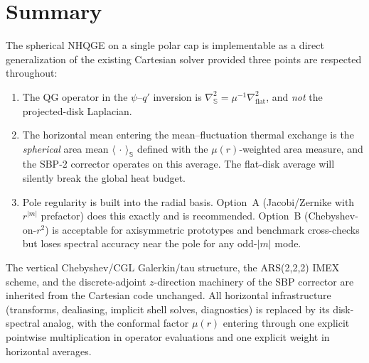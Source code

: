 \documentclass[11pt]{article}
\newcommand{\Lapproj}{\nabla^2_{\!\mathrm{flat}}}
\newcommand{\Lapsphere}{\nabla^2_{\!\mathbb{S}}}
\newcommand{\meanS}[1]{\langle #1 \rangle_{\mathbb{S}}}
\begin{document}
\section{Summary}

The spherical NHQGE on a single polar cap is implementable as a
direct generalization of the existing Cartesian solver provided
three points are respected throughout:

\begin{enumerate}[leftmargin=2em,itemsep=3pt]
  \item The QG operator in the $\psi$--$q'$ inversion is
  $\Lapsphere = \mu^{-1}\Lapproj$, and \emph{not} the projected-disk
  Laplacian.
  \item The horizontal mean entering the mean--fluctuation thermal
  exchange is the \emph{spherical} area mean
  $\meanS{\,\cdot\,}$ defined with the $\mu(r)$-weighted area
  measure, and the SBP-2 corrector operates on this average.  The
  flat-disk average will silently break the global heat budget.
  \item Pole regularity is built into the radial basis.  Option~A
  (Jacobi/Zernike with $r^{|m|}$ prefactor) does this exactly and
  is recommended.  Option~B (Chebyshev-on-$r^{2}$) is acceptable for
  axisymmetric prototypes and benchmark cross-checks but loses
  spectral accuracy near the pole for any odd-$|m|$ mode.
\end{enumerate}

The vertical Chebyshev/CGL Galerkin/tau structure, the
ARS(2,2,2) IMEX scheme, and the discrete-adjoint $z$-direction
machinery of the SBP corrector are inherited from the Cartesian code
unchanged.  All horizontal infrastructure (transforms, dealiasing,
implicit shell solves, diagnostics) is replaced by its disk-spectral
analog, with the conformal factor $\mu(r)$ entering through one
explicit pointwise multiplication in operator evaluations and one
explicit weight in horizontal averages.
\end{document}
